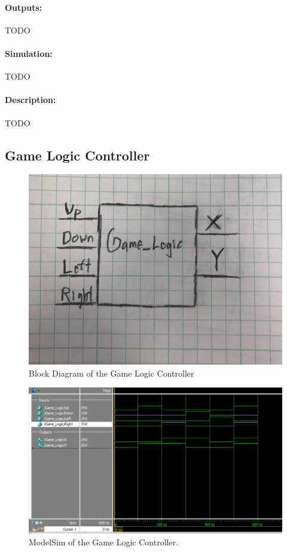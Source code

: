 \documentclass[]{article}
\begin{document}
\paragraph{Outputs:} TODO
\paragraph{Simulation:} TODO
\paragraph{Description:} TODO

\subsection{Game Logic Controller}
\begin{figure}[H]\centering
	\includegraphics[width=\linewidth]{figures/Game_Logic_Diagram}
	\caption{Block Diagram of the Game Logic Controller}
\end{figure}
\begin{figure}[H]\centering
	\includegraphics[width=\linewidth]{figures/Game_Logic_ModelSim.png}
	\caption{ModelSim of the Game Logic Controller.}
\end{figure}
\end{document}

